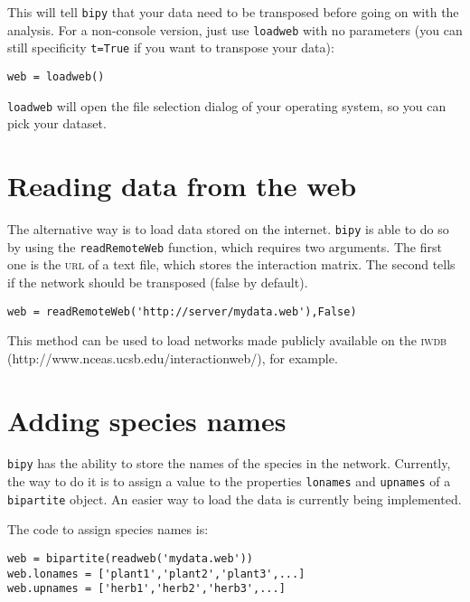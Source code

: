 \documentclass[10pt]{scrbook}
\begin{document}
This will tell \texttt{bipy} that your data need to be transposed before going on with the analysis. For a non-console version, just use \texttt{loadweb} with no parameters (you can still specificity \texttt{t=True} if you want to transpose your data):

\begin{lstlisting}[caption=opening a file dialog]
web = loadweb()
\end{lstlisting}

\texttt{loadweb} will open the file selection dialog of your operating system, so you can pick your dataset.

\section{Reading data from the web}

The alternative way is to load data stored on the internet. \texttt{bipy} is able to do so by using the \texttt{readRemoteWeb} function, which requires two arguments. The first one is the \textsc{url} of a text file, which stores the interaction matrix. The second tells if the network should be transposed (false by default).

\begin{lstlisting}[caption=reading a dataset from the web]
web = readRemoteWeb('http://server/mydata.web'),False)
\end{lstlisting}

This method can be used to load networks made publicly available on the \textsc{iwdb} (http://www.nceas.ucsb.edu/interactionweb/), for example.

\section{Adding species names}

\texttt{bipy} has the ability to store the names of the species in the network. Currently, the way to do it is to assign a value to the properties \texttt{lonames} and \texttt{upnames} of a \texttt{bipartite} object. An easier way to load the data is currently being implemented.

The code to assign species names is:

\begin{lstlisting}[caption=attributing species names]
web = bipartite(readweb('mydata.web'))
web.lonames = ['plant1','plant2','plant3',...]
web.upnames = ['herb1','herb2','herb3',...]
\end{lstlisting}
\end{document}
